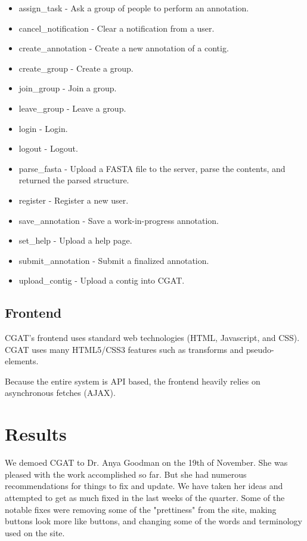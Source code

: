 \documentclass[10pt, conference, compsocconf]{IEEEtran}
\begin{document}
\begin{itemize}
\item assign\_task - Ask a group of people to perform an annotation.
\item cancel\_notification - Clear a notification from a user.
\item create\_annotation - Create a new annotation of a contig.
\item create\_group - Create a group.
\item join\_group - Join a group.
\item leave\_group - Leave a group.
\item login - Login.
\item logout - Logout.
\item parse\_fasta - Upload a FASTA file to the server, parse the contents, and returned the parsed structure.
\item register - Register a new user.
\item save\_annotation - Save a work-in-progress annotation.
\item set\_help - Upload a help page.
\item submit\_annotation - Submit a finalized annotation.
\item upload\_contig - Upload a contig into CGAT.
\end{itemize}

\subsection{Frontend}
CGAT's frontend uses standard web technologies (HTML, Javascript, and CSS).
CGAT uses many HTML5/CSS3 features such as transforms and pseudo-elements.

Because the entire system is API based, the frontend heavily relies on asynchronous fetches (AJAX).

\section{Results}\label{sec:results}
We demoed CGAT to Dr. Anya Goodman on the 19th of November. She was pleased with
the work accomplished so far. But she had numerous recommendations for things to fix and update.
We have taken her ideas and attempted to get as much fixed in the last weeks of the quarter.
Some of the notable fixes were removing some of the "prettiness" from the site, making
buttons look more like buttons, and changing some of the words and terminology used on the site.
\end{document}
